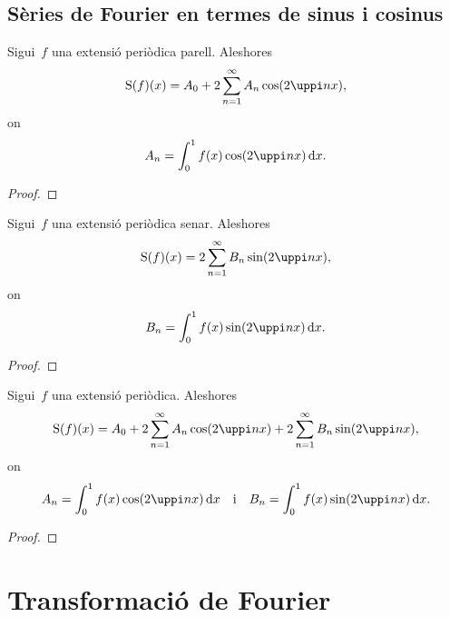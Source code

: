 \documentclass[../../main.tex]{subfiles}
\begin{document}
	\subsection{Sèries de Fourier en termes de sinus i cosinus}
	\begin{proposition}
		\label{prop:sèrie de Fourier d'una funció parell}
		Sigui~\(f\) una extensió periòdica parell.
		Aleshores
		\[
		    \sfourier(f)(x)=A_{0}+2\sum_{n=1}^{\infty}A_{n}\cos(2\uppi nx),
		\]
		on
		\[
		    A_{n}=\int_{0}^{1}f(x)\cos(2\uppi nx)\diff x.
		\] %
		\begin{proof}
		\end{proof}
	\end{proposition}
	\begin{proposition}
		\label{prop:sèrie de Fourier d'una funció senar}
		Sigui~\(f\) una extensió periòdica senar.
		Aleshores
		\[
		    \sfourier(f)(x)=2\sum_{n=1}^{\infty}B_{n}\sin(2\uppi nx),
		\]
		on
		\[
		    B_{n}=\int_{0}^{1}f(x)\sin(2\uppi nx)\diff x.
		\]
		\begin{proof}
		\end{proof}
	\end{proposition}
	\begin{theorem}
		Sigui~\(f\) una extensió periòdica.
		Aleshores
		\[
		    \sfourier(f)(x)=A_{0}+2\sum_{n=1}^{\infty}A_{n}\cos(2\uppi nx)+2\sum_{n=1}^{\infty}B_{n}\sin(2\uppi nx),
		\]
		on
		\[
		    A_{n}=\int_{0}^{1}f(x)\cos(2\uppi nx)\diff x\quad\text{i}\quad B_{n}=\int_{0}^{1}f(x)\sin(2\uppi nx)\diff x.
		\]
		\begin{proof}
		\end{proof}
	\end{theorem}
\section{Transformació de Fourier}
\end{document}
